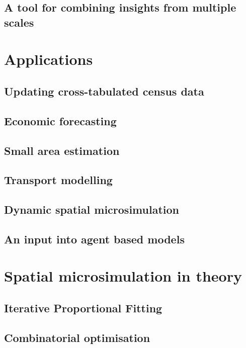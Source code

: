 \documentclass[a5paper, 11pt, twoside]{book}  %
\begin{document}
\section{A tool for combining insights from multiple scales}

\chapter{Applications}


\section{Updating cross-tabulated census data}

\section{Economic forecasting}

\section{Small area estimation}

\section{Transport modelling}

\section{Dynamic spatial microsimulation}

\section{An input into agent based models}

\chapter{Spatial microsimulation in theory}\label{s:theory}


\section{Iterative Proportional Fitting}

\section{Combinatorial optimisation}
\end{document}
